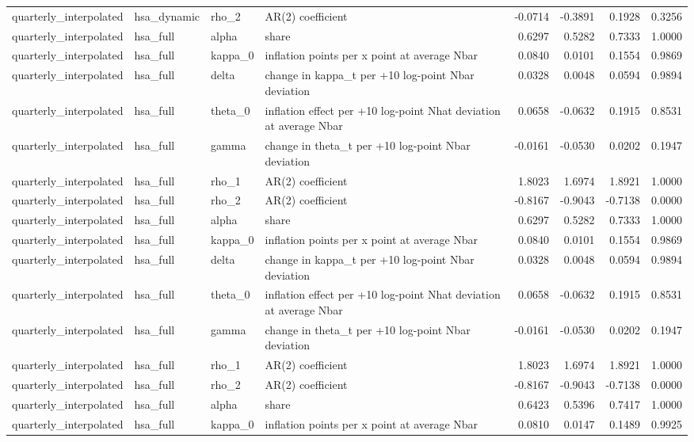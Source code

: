 \begin{tabular}{llllrrrr}
quarterly\_interpolated & hsa\_dynamic & rho\_2 & AR(2) coefficient & -0.0714 & -0.3891 & 0.1928 & 0.3256 \\
quarterly\_interpolated & hsa\_full & alpha & share & 0.6297 & 0.5282 & 0.7333 & 1.0000 \\
quarterly\_interpolated & hsa\_full & kappa\_0 & inflation points per x point at average Nbar & 0.0840 & 0.0101 & 0.1554 & 0.9869 \\
quarterly\_interpolated & hsa\_full & delta & change in kappa\_t per +10 log-point Nbar deviation & 0.0328 & 0.0048 & 0.0594 & 0.9894 \\
quarterly\_interpolated & hsa\_full & theta\_0 & inflation effect per +10 log-point Nhat deviation at average Nbar & 0.0658 & -0.0632 & 0.1915 & 0.8531 \\
quarterly\_interpolated & hsa\_full & gamma & change in theta\_t per +10 log-point Nbar deviation & -0.0161 & -0.0530 & 0.0202 & 0.1947 \\
quarterly\_interpolated & hsa\_full & rho\_1 & AR(2) coefficient & 1.8023 & 1.6974 & 1.8921 & 1.0000 \\
quarterly\_interpolated & hsa\_full & rho\_2 & AR(2) coefficient & -0.8167 & -0.9043 & -0.7138 & 0.0000 \\
quarterly\_interpolated & hsa\_full & alpha & share & 0.6297 & 0.5282 & 0.7333 & 1.0000 \\
quarterly\_interpolated & hsa\_full & kappa\_0 & inflation points per x point at average Nbar & 0.0840 & 0.0101 & 0.1554 & 0.9869 \\
quarterly\_interpolated & hsa\_full & delta & change in kappa\_t per +10 log-point Nbar deviation & 0.0328 & 0.0048 & 0.0594 & 0.9894 \\
quarterly\_interpolated & hsa\_full & theta\_0 & inflation effect per +10 log-point Nhat deviation at average Nbar & 0.0658 & -0.0632 & 0.1915 & 0.8531 \\
quarterly\_interpolated & hsa\_full & gamma & change in theta\_t per +10 log-point Nbar deviation & -0.0161 & -0.0530 & 0.0202 & 0.1947 \\
quarterly\_interpolated & hsa\_full & rho\_1 & AR(2) coefficient & 1.8023 & 1.6974 & 1.8921 & 1.0000 \\
quarterly\_interpolated & hsa\_full & rho\_2 & AR(2) coefficient & -0.8167 & -0.9043 & -0.7138 & 0.0000 \\
quarterly\_interpolated & hsa\_full & alpha & share & 0.6423 & 0.5396 & 0.7417 & 1.0000 \\
quarterly\_interpolated & hsa\_full & kappa\_0 & inflation points per x point at average Nbar & 0.0810 & 0.0147 & 0.1489 & 0.9925 \\

\end{tabular}
